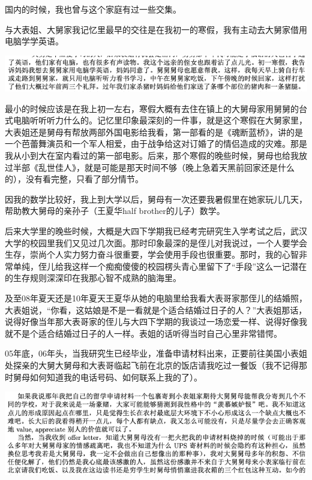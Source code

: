 \documentclass[9pt, b5paper]{article}
\begin{document}
国内的时候，我也曾与这个家庭有过一些交集。 

与大表姐、大舅家我记忆里最早的交往是在我初一的寒假，我有主动去大舅家借用电脑学学英语。

\begin{center}
\includegraphics[width=.9\linewidth]{./pic/p1p47-2.png}
\end{center}

最小的时候应该是在我上初一左右，寒假大概有去住在镇上的大舅母家用舅舅的台式电脑听听听力什么的。记忆里印象最深刻的一件事，就是这个寒假在大舅家里，大表姐还是舅母有帮放两部外国电影给我看，第一部看的是《魂断蓝桥》，讲的是一个芭蕾舞演员和一个军人相爱，由于战争给这对订婚了的情侣造成的灾难。那是我从小到大在室内看过的第一部电影。后来，那个寒假的晚些时候，舅母也给我放过半部《乱世佳人》，就是可能是那天时间不够（晚上急着天黑前回家还是什么的），没有看完整，只看了部分情节。

因我的数学比较好，我上到大学以后，舅母有一次还要我暑假里在她家玩儿几天，帮助教大舅母的亲孙子（王夏华half brother的儿子）数学。

后来大学里的晚些时候，大概是大四下学期我已经考完研究生入学考试之后，武汉大学的校园里我们又见过几次面。那时印象最深的是侄儿对我说过，一个人要学会生存，崇尚个人实力努力奋斗很重要，学会使用手段也很重要。那时，我的心智非常单纯，侄儿给我这样一个痴痴傻傻的校园楞头青心里留下了“手段”这么一记潜在的生存规则深深印在我那心智不成熟的脑海里。

及至08年夏天还是10年夏天王夏华从她的电脑里给我看大表哥家那侄儿的结婚照，大表姐说，“你看，这姑娘是不是一看就是个适合结婚过日子的人？”大表姐那话，说得好像当年那大表哥家的侄儿与大四下学期的我谈过一场恋爱一样、说得好像我就不是个适合结婚过日子的人一样。表姐的话听得当时自己心里非常错愕。

05年底，06年头，当我研究生已经毕业，准备申请材料出来，正要前往美国小表姐处探亲的大舅大舅母和大表哥临起飞前在北京的饭店请我吃过一餐饭（我不记得那时舅母如何知道我的电话号码、如何联系上我的了）。

\begin{center}
\includegraphics[width=.9\linewidth]{./pic/p1p124.png}
\end{center}
\end{document}
